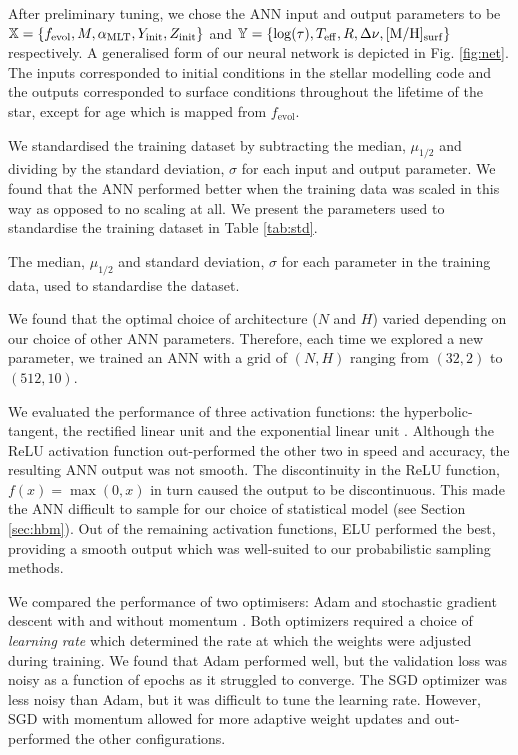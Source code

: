 After preliminary tuning, we chose the ANN input and output parameters to be $\boldsymbol{\mathbb{X}} = \{f_\mathrm{evol}, M, {\alpha_\mathrm{MLT}}, Y_\mathrm{init}, Z_\mathrm{init}\}$ and $\boldsymbol{\mathbb{Y}} = \{\log(\tau), {T_\mathrm{eff}}, R, {\Delta\nu}, [\mathrm{M}/\mathrm{H}]_\mathrm{surf}\}$ respectively. A generalised form of our neural network is depicted in Fig. \ref{fig:net}. The inputs corresponded to initial conditions in the stellar modelling code and the outputs corresponded to surface conditions throughout the lifetime of the star, except for age which is mapped from $f_\mathrm{evol}$.

We standardised the training dataset by subtracting the median, $\mu_{1/2}$ and dividing by the standard deviation, $\sigma$ for each input and output parameter. We found that the ANN performed better when the training data was scaled in this way as opposed to no scaling at all. We present the parameters used to standardise the training dataset in Table \ref{tab:std}.

\begin{table}
    \centering
    \caption[The median and standard deviation for each parameter in the training data, used to standardise the dataset.]{The median, $\mu_{1/2}$ and standard deviation, $\sigma$ for each parameter in the training data, used to standardise the dataset.}
    \label{tab:std}
    
\end{table}

We found that the optimal choice of architecture ($N$ and $H$) varied depending on our choice of other ANN parameters. Therefore, each time we explored a new parameter, we trained an ANN with a grid of $(N,H)$ ranging from $(32, 2)$ to $(512, 10)$.

We evaluated the performance of three activation functions: the hyperbolic-tangent, the rectified linear unit \citep[ReLU;][]{Hahnloser.Sarpeshkar.ea2000, Glorot.Bordes.ea2011} and the exponential linear unit \citep[ELU;][]{Clevert.Unterthiner.ea2015}. Although the ReLU activation function out-performed the other two in speed and accuracy, the resulting ANN output was not smooth. The discontinuity in the ReLU function, $f(x) = \max(0, x)$ in turn caused the output to be discontinuous. This made the ANN difficult to sample for our choice of statistical model (see Section \ref{sec:hbm}). Out of the remaining activation functions, ELU performed the best, providing a smooth output which was well-suited to our probabilistic sampling methods.

We compared the performance of two optimisers: Adam \citep{Kingma.Ba2014} and stochastic gradient descent \citep[SGD; see e.g.][]{Ruder2016} with and without momentum \citep{Qian1999}. Both optimizers required a choice of \emph{learning rate} which determined the rate at which the weights were adjusted during training. We found that Adam performed well, but the validation loss was noisy as a function of epochs as it struggled to converge. The SGD optimizer was less noisy than Adam, but it was difficult to tune the learning rate. However, SGD with momentum allowed for more adaptive weight updates and out-performed the other configurations.

